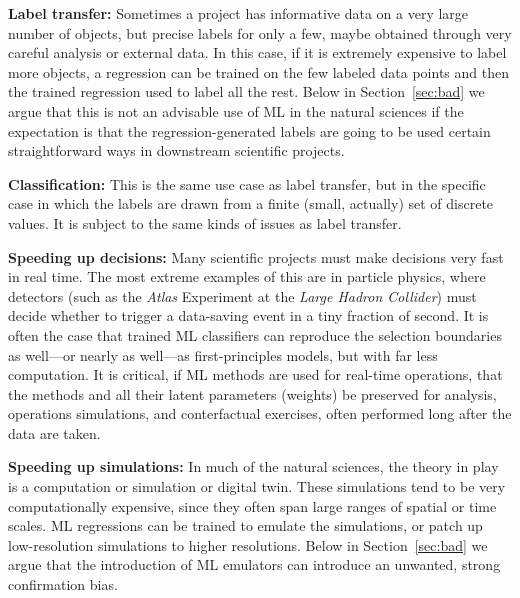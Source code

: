 \documentclass{article}
\renewcommand{\paragraph}[1]{\noindent\par\textbf{#1}}
\newcommand{\sectionname}{Section}
\newcommand{\secref}[1]{\sectionname~\ref{#1}}
\begin{document}
\paragraph{Label transfer:}
Sometimes a project has informative data on a very large number of objects, but precise labels for only a few, maybe obtained through very careful analysis or external data.
In this case, if it is extremely expensive to label more objects, a regression can be trained on the few labeled data points and then the trained regression used to label all the rest.
Below in \secref{sec:bad} we argue that this is not an advisable use of ML in the natural sciences if the expectation is that the regression-generated labels are going to be used certain straightforward ways in downstream scientific projects.

\paragraph{Classification:}
This is the same use case as label transfer, but in the specific case in which the labels are drawn from a finite (small, actually) set of discrete values.
It is subject to the same kinds of issues as label transfer.
  
\paragraph{Speeding up decisions:}
Many scientific projects must make decisions very fast in real time.
The most extreme examples of this are in particle physics, where detectors (such as the \textsl{Atlas} Experiment \cite{atlas} at the \textsl{Large Hadron Collider}) must decide whether to trigger a data-saving event in a tiny fraction of second.
It is often the case that trained ML classifiers can reproduce the selection boundaries as well---or nearly as well---as first-principles models, but with far less computation.
It is critical, if ML methods are used for real-time operations, that the methods and all their latent parameters (weights) be preserved for analysis, operations simulations, and conterfactual exercises, often performed long after the data are taken.

\paragraph{Speeding up simulations:}
In much of the natural sciences, the theory in play is a computation or simulation or digital twin.
These simulations tend to be very computationally expensive, since they often span large ranges of spatial or time scales.
ML regressions can be trained to emulate the simulations, or patch up low-resolution simulations to higher resolutions.
Below in \secref{sec:bad} we argue that the introduction of ML emulators can introduce an unwanted, strong confirmation bias.
\end{document}
